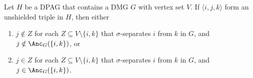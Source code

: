 \begin{Prp}\label{prp:orienting_unshielded_triples}
  Let $H$ be a DPAG that contains a DMG $G$ with vertex set $V$.
  If $\langle i, j, k \rangle$ form an unshielded triple in $H$, then
  either 
  \begin{enumerate}[label=(\roman*)]
    \item $j \notin Z$ for each $Z \subseteq V \setminus \{i,k\}$ that $\sigma$-separates $i$ from $k$ in $G$, and $j \notin \Anc_G(\{i,k\})$, or
    \item $j \in Z$ for each $Z \subseteq V \setminus \{i,k\}$ that $\sigma$-separates $i$ from $k$ in $G$, and $j \in \Anc_G(\{i,k\})$.
  \end{enumerate}
\end{Prp}
